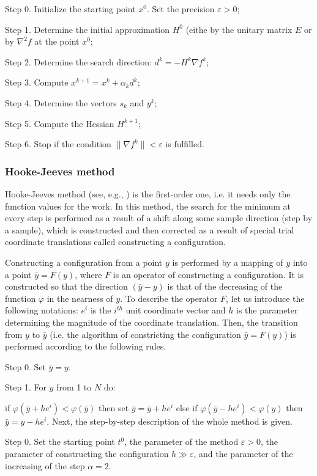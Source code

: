 \documentclass[runningheads]{llncs}
\begin{document}
Step 0. Initialize the starting point $x^0$. Set the precision $\varepsilon > 0$;

Step 1. Determine the initial approximation $H^0$ (eithe by the unitary matrix $E$ or by $\nabla^2 f$ at the point $x^0$;

Step 2. Determine the search direction: $d^k = -H^k \nabla f^k$;

Step 3. Compute $x^{k+1} = x^k + \alpha_k d^k$;

Step 4. Determine the vectors $s_k$ and $y^k$;

Step 5. Compute the Hessian $H^{k+1}$;

Step 6. Stop if the condition $\|\nabla f^k\| < \varepsilon$ is fulfilled.

\subsubsection{Hooke-Jeeves method}
Hooke-Jeeves method (see, e.g., \cite{Himmelblau} ) is the first-order one, i.e. it needs only the function values for the work. In this method, the search for the minimum at every step is performed as a result of a shift along some sample direction (step by a sample), which is constructed and then corrected as a result of special trial coordinate translations called constructing a configuration.

Constructing a configuration from a point $y$ is performed by a mapping of $y$ into a point $\bar{y} = F(y)$, where $F$ is an operator of constructing a configuration. It is constructed so that the direction $(\bar{y} - y)$ is that of the decreasing of the function $\varphi$ in the nearness of $y$. To describe the operator $F$, let us introduce the following notations: $e^i$ is the $i^{th}$ unit coordinate vector and $h$ is the parameter determining the magnitude of the coordinate translation. Then, the transition from $y$ to $\bar{y}$ (i.e. the algorithm of constricting the configuration $\bar{y} = F(y)$) is performed according to the following rules.

Step 0. Set $\bar{y} = y$.

Step 1. For $y$ from 1 to $N$ do:

if $\varphi(\bar{y} + he^i) < \varphi(\bar{y})$ then set $\bar{y} = \bar{y} + he^i$ else if $\varphi(\bar{y} - he^i) < \varphi(y)$ then $\bar{y} = y - he^i.$
Next, the step-by-step description of the whole method is given.

Step 0. Set the starting point $t^0$, the parameter of the method $\varepsilon > 0$, the parameter of constructing the configuration $h\gg\varepsilon$, and the parameter of the increasing of the step $\alpha=2$.
\end{document}
